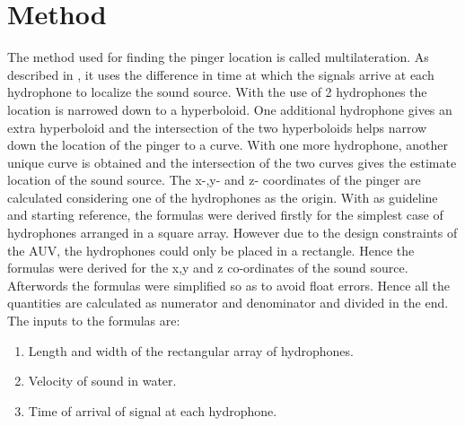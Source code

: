 \section{Method}\label{sec:method}
The method used for finding the pinger location is called multilateration. As described in \cite{web:multilateration}, it uses the difference in time at which the signals arrive at each hydrophone to localize the sound source. With the use of 2 hydrophones the location is narrowed down to a hyperboloid. One additional hydrophone gives an extra hyperboloid and the intersection of the two hyperboloids helps narrow down the location of the pinger to a curve. With one more hydrophone, another unique curve is obtained and the intersection of the two curves gives the estimate location of the sound source. The x-,y- and z- coordinates of the pinger are calculated considering one of the hydrophones as the origin.\newline
With \cite{article:multilateration} as guideline and starting reference, the formulas were derived firstly for the simplest case of hydrophones arranged in a square array. However due to the design constraints of the AUV, the hydrophones could only be placed in a rectangle. Hence the formulas were derived for the x,y and z co-ordinates of the sound source. Afterwords the formulas were simplified so as to avoid float errors. Hence all the quantities are calculated as numerator and denominator and divided in the end.\newline
The inputs to the formulas are:\begin{enumerate}
\item Length and width of the rectangular array of hydrophones.
\item Velocity of sound in water.
\item Time of arrival of signal at each hydrophone.
\end{enumerate}


